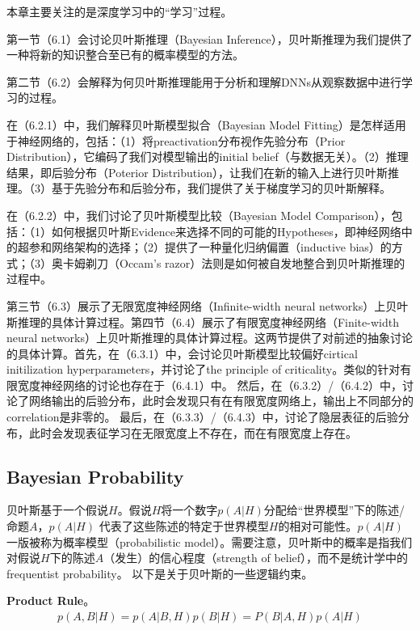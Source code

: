 本章主要关注的是深度学习中的“学习”过程。

第一节（6.1）会讨论贝叶斯推理（Bayesian Inference），贝叶斯推理为我们提供了一种将新的知识整合至已有的概率模型的方法。

第二节（6.2）会解释为何贝叶斯推理能用于分析和理解DNNs从观察数据中进行学习的过程。

在（6.2.1）中，我们解释贝叶斯模型拟合（Bayesian Model Fitting）是怎样适用于神经网络的，包括：（1）将preactivation分布视作先验分布（Prior Distribution），它编码了我们对模型输出的initial belief（与数据无关）。（2）推理结果，即后验分布（Poterior Distribution），让我们在新的输入上进行贝叶斯推理。（3）基于先验分布和后验分布，我们提供了关于梯度学习的贝叶斯解释。

在（6.2.2）中，我们讨论了贝叶斯模型比较（Bayesian Model Comparison），包括：（1）如何根据贝叶斯Evidence来选择不同的可能的Hypotheses，即神经网络中的超参和网络架构的选择；（2）提供了一种量化归纳偏置（inductive bias）的方式；（3）奥卡姆剃刀（Occam's razor）法则是如何被自发地整合到贝叶斯推理的过程中。

第三节（6.3）展示了无限宽度神经网络（Infinite-width neural networks）上贝叶斯推理的具体计算过程。第四节（6.4）展示了有限宽度神经网络（Finite-width neural networks）上贝叶斯推理的具体计算过程。这两节提供了对前述的抽象讨论的具体计算。首先，在（6.3.1）中，会讨论贝叶斯模型比较偏好cirtical initilization hyperparameters，并讨论了the principle of criticality。类似的针对有限宽度神经网络的讨论也存在于（6.4.1）中。
然后，在（6.3.2）/（6.4.2）中，讨论了网络输出的后验分布，此时会发现只有在有限宽度网络上，输出上不同部分的correlation是非零的。
最后，在（6.3.3）/（6.4.3）中，讨论了隐层表征的后验分布，此时会发现表征学习在无限宽度上不存在，而在有限宽度上存在。


\subsection{Bayesian Probability}
贝叶斯基于一个假说$H$。假说$H$将一个数字$p(A|H)$分配给``世界模型''下的陈述/命题$A$，$p(A|H)$ 代表了这些陈述的特定于世界模型$H$的相对可能性。$p(A|H)$ 一版被称为概率模型（probabilistic model）。需要注意，贝叶斯中的概率是指我们对假说$H$下的陈述$A$（发生）的信心程度（strength of belief），而不是统计学中的frequentist probability。
以下是关于贝叶斯的一些逻辑约束。

\textbf{Product Rule}。
\begin{equation}
    \begin{split}
    p(A,B|H) = p(A|B,H)p(B|H) = P(B|A,H)p(A|H)
    \end{split}
    \label{sec6:product_rule}
\end{equation}

